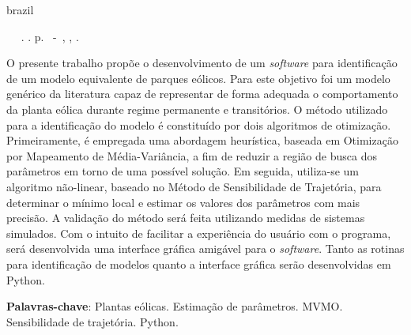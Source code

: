 \setlength{\absparsep}{18pt} %

\begin{resumo}[Resumo]

\begin{otherlanguage*}{brazil}

\begin{flushleft} 
	\setlength{\absparsep}{0pt} %
	\SingleSpacing 
	\imprimirautorabr~ ~\textbf{\imprimirtitulo}.	\imprimirdata. \pageref{LastPage}p. 
	\imprimirtipotrabalho~-~\imprimirinstituicao, \imprimirlocal, \imprimirdata. 
\end{flushleft}

\OnehalfSpacing 			

O presente trabalho prop\~oe o desenvolvimento de um \textit{software} para identifica\c{c}\~ao de um modelo equivalente de parques e\'olicos. Para este objetivo foi um modelo gen\'erico da literatura capaz de representar de forma adequada o comportamento da planta e\'olica durante regime permanente e transit\'orios. O m\'etodo utilizado para a identifica\c{c}\~ao do modelo \'e constitu\'ido por dois algoritmos de otimiza\c{c}\~ao. Primeiramente, \'e empregada uma abordagem heur\'istica, baseada em Otimiza\c{c}\~ao por Mapeamento de M\'edia-Vari\^ancia, a fim de reduzir a regi\~ao de busca dos par\^ametros em torno de uma poss\'ivel solu\c{c}\~ao. Em seguida, utiliza-se um algoritmo n\~ao-linear, baseado no M\'etodo de Sensibilidade de Trajet\'oria, para determinar o m\'inimo local e estimar os valores dos par\^ametros com mais precis\~ao. A valida\c{c}\~ao do m\'etodo ser\'a feita utilizando medidas de sistemas simulados. Com o intuito de facilitar a experi\^encia do usu\'ario com o programa, ser\'a desenvolvida uma interface gr\'afica amig\'avel para o \textit{software}. Tanto as rotinas para identifica\c{c}\~ao de modelos quanto a interface gr\'afica ser\~ao desenvolvidas em Python.
 

\textbf{Palavras-chave}: Plantas e\'olicas. Estima\c{c}\~ao de par\^ametros. MVMO. Sensibilidade de trajet\'oria. Python.

\end{otherlanguage*}

\end{resumo}